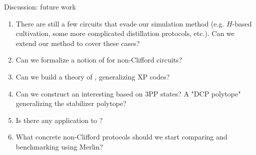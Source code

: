 \documentclass[aspectratio=169,11pt,t]{beamer}
\begin{document}
\begin{frame}{Discussion: future work}
  \begin{enumerate}
    \item There are still a few circuits that evade our simulation method (e.g. $H$-based cultivation, some more complicated distillation protocols, etc.). Can we extend our method to cover these cases?
    \item Can we formalize a notion of  for non-Clifford circuits?
    \item Can we build a theory of , generalizing XP codes?
    \item Can we construct an interesting  based on 3PP states? A "DCP polytope" generalizing the stabilizer polytope?
    \item Is there any application to ?
    \item What concrete non-Clifford protocols should we start comparing and benchmarking using Merlin?
  \end{enumerate}
  \paperlinks
\end{frame}
\end{document}
